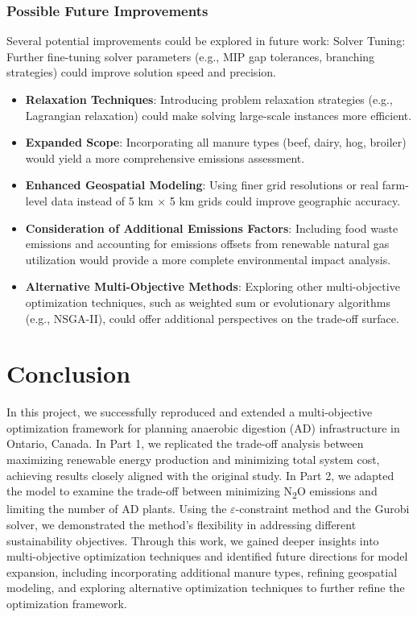 \documentclass[12pt]{article}
\begin{document}
\subsubsection{Possible Future Improvements}
Several potential improvements could be explored in future work:
Solver Tuning: Further fine-tuning solver parameters (e.g., MIP gap tolerances, branching strategies) could improve solution speed and precision.
\begin{itemize}
  \item \textbf{Relaxation Techniques}: Introducing problem relaxation strategies (e.g., Lagrangian relaxation) could make solving large-scale instances more efficient.
  \item \textbf{Expanded Scope}: Incorporating all manure types (beef, dairy, hog, broiler) would yield a more comprehensive emissions assessment.
  \item \textbf{Enhanced Geospatial Modeling}: Using finer grid resolutions or real farm-level data instead of 5 km × 5 km grids could improve geographic accuracy.
  \item \textbf{Consideration of Additional Emissions Factors}: Including food waste emissions and accounting for emissions offsets from renewable natural gas utilization would provide a more complete environmental impact analysis.
  \item \textbf{Alternative Multi-Objective Methods}: Exploring other multi-objective optimization techniques, such as weighted sum or evolutionary algorithms (e.g., NSGA-II), could offer additional perspectives on the trade-off surface.
\end{itemize}


\section{Conclusion}
In this project, we successfully reproduced and extended a multi-objective optimization framework for planning anaerobic digestion (AD) infrastructure in Ontario, Canada. In Part 1, we replicated the trade-off analysis between maximizing renewable energy production and minimizing total system cost, achieving results closely aligned with the original study. In Part 2, we adapted the model to examine the trade-off between minimizing N\textsubscript{2}O emissions and limiting the number of AD plants. Using the $\varepsilon$-constraint method and the Gurobi solver, we demonstrated the method's flexibility in addressing different sustainability objectives. Through this work, we gained deeper insights into multi-objective optimization techniques and identified future directions for model expansion, including incorporating additional manure types, refining geospatial modeling, and exploring alternative optimization techniques to further refine the optimization framework.
\end{document}
